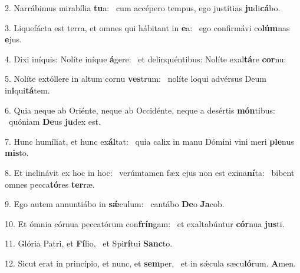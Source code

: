 2. Narrábimus mirabília \textbf{tu}a: \ast\  cum accépero tempus, ego justítias \textbf{ju}di\textbf{cá}bo.\

3. Liquefácta est terra, et omnes qui hábitant in \textbf{e}a: \ast\  ego confirmávi co\textbf{lúm}nas \textbf{e}jus.\

4. Dixi iníquis: Nolíte iníque \textbf{á}gere: \ast\  et delinquéntibus: Nolíte exal\textbf{tá}re \textbf{cor}nu:\

5. Nolíte extóllere in altum cornu \textbf{ves}trum: \ast\  nolíte loqui advérsus Deum in\textbf{i}qui\textbf{tá}tem.\

6. Quia neque ab Oriénte, neque ab Occidénte, neque a desértis \textbf{món}tibus: \ast\  quóniam \textbf{De}us \textbf{ju}dex est.\

7. Hunc humíliat, et hunc ex\textbf{ál}tat: \ast\  quia calix in manu Dómini vini meri \textbf{ple}nus \textbf{mis}to.\

8. Et inclinávit ex hoc in hoc: \dag\  verúmtamen fæx ejus non est exina\textbf{ní}ta: \ast\  bibent omnes pecca\textbf{tó}res \textbf{ter}ræ.\

9. Ego autem annuntiábo in \textbf{sǽ}culum: \ast\  cantábo \textbf{De}o \textbf{Ja}cob.\

10. Et ómnia córnua peccatórum con\textbf{frín}gam: \ast\  et exaltabúntur \textbf{cór}nua \textbf{jus}ti.\

11. Glória Patri, et \textbf{Fí}lio, \ast\  et Spi\textbf{rí}tui \textbf{Sanc}to.\

12. Sicut erat in princípio, et nunc, et \textbf{sem}per, \ast\  et in sǽcula sæcu\textbf{ló}rum. \textbf{A}men.\


